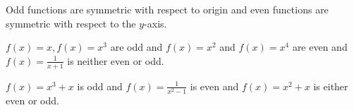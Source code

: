 \documentclass[../main.tex]{subfiles}
\begin{document}
Odd functions are symmetric with respect to origin and even functions are symmetric with respect to the $y$-axis.


\begin{example}
  $f(x)=x,f(x)=x^{3}$ are odd and $f(x)=x^{2}$ and $f(x) =x^{4}$ are even and $f(x)=\frac{1}{x+1}$ is neither even or odd.
\end{example}

\begin{example}
  $f(x)=x^{3}+x$ is odd and $f(x)=\frac{1}{x^{2}-1}$ is even and $f(x)=x^{2}+x$
  is either even or odd.
\end{example}
\end{document}
